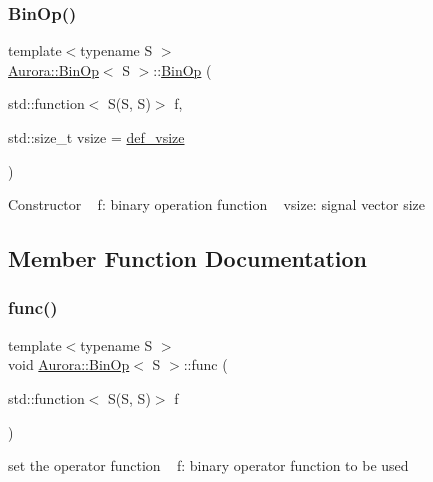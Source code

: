 \subsubsection{\texorpdfstring{Bin\+Op()}{BinOp()}}
{\footnotesize\ttfamily template$<$typename S $>$ \\
\hyperlink{class_aurora_1_1_bin_op}{Aurora\+::\+Bin\+Op}$<$ S $>$\+::\hyperlink{class_aurora_1_1_bin_op}{Bin\+Op} (\begin{DoxyParamCaption}\item[{std\+::function$<$ S(S, S)$>$}]{f,  }\item[{std\+::size\+\_\+t}]{vsize = {\ttfamily \hyperlink{namespace_aurora_afaaddf667a06e7ce23c667a8b7295263}{def\+\_\+vsize}} }\end{DoxyParamCaption})\hspace{0.3cm}{\ttfamily [inline]}}

Constructor ~\newline
f\+: binary operation function ~\newline
vsize\+: signal vector size 

\subsection{Member Function Documentation}
\mbox{\label{class_aurora_1_1_bin_op_a200e19232db44814c4977be0b33654b7}} 
\subsubsection{\texorpdfstring{func()}{func()}}
{\footnotesize\ttfamily template$<$typename S $>$ \\
void \hyperlink{class_aurora_1_1_bin_op}{Aurora\+::\+Bin\+Op}$<$ S $>$\+::func (\begin{DoxyParamCaption}\item[{std\+::function$<$ S(S, S)$>$}]{f }\end{DoxyParamCaption})\hspace{0.3cm}{\ttfamily [inline]}}

set the operator function ~\newline
f\+: binary operator function to be used \mbox{\label{class_aurora_1_1_bin_op_aef7a0a9a5daa40c22e540f08ca928fab}} 
